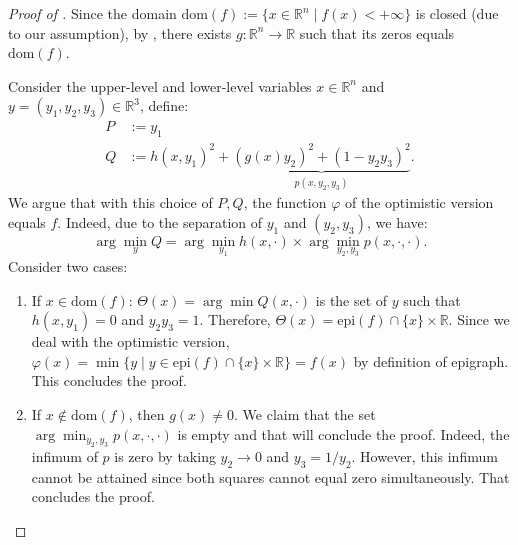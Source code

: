 \documentclass{article}
\newcommand*{\RR}{\mathbb{R}}
\newcommand{\argmin}{\arg\min}
\newcommand{\firstvar}{x}
\newcommand{\secondvar}{y}
\newcommand{\valbilevel}{\varphi}
\theoremstyle{plain}
\theoremstyle{definition}
\begin{document}
\begin{appendices}
\begin{proof}[Proof of ]
    Since the domain $\mathrm{dom}(f) := \{\firstvar \in \RR^n \mid f(\firstvar) < +\infty\}$ is closed (due to our assumption), by , there exists $g: \RR^n \to \RR$ such that its zeros equals $\mathrm{dom}(f)$.
    
    Consider the upper-level and lower-level variables $\firstvar \in \RR^n$ and $\secondvar = (\secondvar_1, \secondvar_2, \secondvar_3) \in \RR^3$, define:
    \begin{equation*}
        \begin{aligned}
            P &:= \secondvar_1\\
            Q &:= h(\firstvar,\secondvar_1)^2 + \underbrace{\left(g(\firstvar)\secondvar_2\right)^2 + (1 - \secondvar_2\secondvar_3)^2}_{p(\firstvar, \secondvar_2, \secondvar_3)}.
        \end{aligned}
    \end{equation*}
    We argue that with this choice of $P,Q$, the function $\valbilevel$ of the optimistic version equals $f$. Indeed, due to the separation of $\secondvar_1$ and $(\secondvar_2, \secondvar_3)$, we have:
    \begin{equation*}
        \argmin_\secondvar Q = \argmin_{\secondvar_1} h(\firstvar, \cdot) \times \argmin_{\secondvar_2, \secondvar_3} p(\firstvar, \cdot, \cdot).
    \end{equation*}
    Consider two cases:
    \begin{enumerate}
        \item If $\firstvar \in \mathrm{dom}(f)$: $\Theta(\firstvar) = \argmin Q(\firstvar, \cdot)$ is the set of $\secondvar$ such that $h(\firstvar,\secondvar_1) = 0$ and $\secondvar_2\secondvar_3 = 1$. Therefore, $\Theta(x) = \mathrm{epi}(f) \cap \{x\} \times \RR$. Since we deal with the optimistic version, $\valbilevel(\firstvar) = \min \{\secondvar \mid \secondvar \in \mathrm{epi}(f) \cap \{x\} \times \RR\} = f(x)$ by definition of epigraph. This concludes the proof. 
        \item If $\firstvar \notin \mathrm{dom}(f)$, then $g(\firstvar) \neq 0$. We claim that the set $\argmin_{\secondvar_2, \secondvar_3} p(\firstvar, \cdot, \cdot)$ is empty and that will conclude the proof. Indeed, the infimum of $p$ is zero by taking $\secondvar_2 \to 0$ and $\secondvar_3 = 1 / \secondvar_2$. However, this infimum cannot be attained since both squares cannot equal zero simultaneously. That concludes the proof.
    \end{enumerate}
\end{proof}

\end{appendices}
\end{document}
